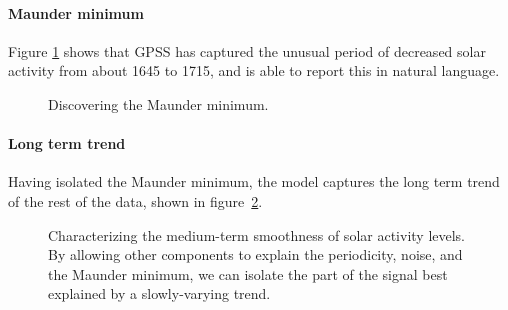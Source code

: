 \documentclass{article}
\begin{document}

\paragraph{Maunder minimum}

Figure \ref{fig:maunder} shows that GPSS has captured the unusual period of decreased solar activity from about 1645 to 1715, and is able to report this in natural language.

\begin{figure}[ht]
\centering
{}
\caption{Discovering the Maunder minimum.}
\label{fig:maunder}
\end{figure}

\paragraph{Long term trend}

Having isolated the Maunder minimum, the model captures the long term trend of the rest of the data, shown in figure~\ref{fig:smooth}.

\begin{figure}[h!]
\centering
{}
\caption{Characterizing the medium-term smoothness of solar activity levels.  By allowing other components to explain the periodicity, noise, and the Maunder minimum, we can isolate the part of the signal best explained by a slowly-varying trend.}
\label{fig:smooth}
\end{figure}
\end{document}
